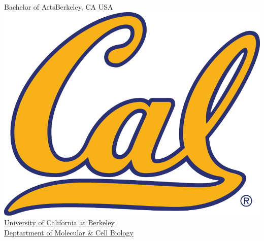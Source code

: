 \documentclass[letterpaper]{twentysecond-charactersheet}
\begin{document}
		{Bachelor of Arts}{Berkeley, CA USA}%
		{\includegraphics[width=\logowidth]{img/cal.png}}%
		{\href{http://mcb.berkeley.edu/}{University of California at Berkeley\\Deptartment of Molecular \& Cell Biology}}%
		{}%

\vspace{-24pt}
\qrgen{\qrtext}
\end{document}
